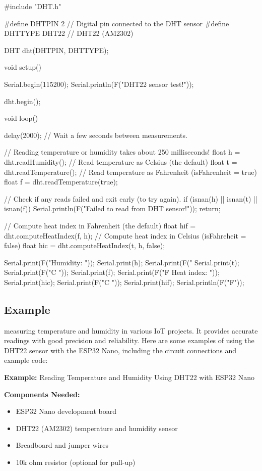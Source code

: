 	\begin{Arduino}
	#include "DHT.h"
	
	#define DHTPIN 2      // Digital pin connected to the DHT sensor
	#define DHTTYPE DHT22 // DHT22 (AM2302)
	
	DHT dht(DHTPIN, DHTTYPE);
	
	void setup() {
		Serial.begin(115200);
		Serial.println(F("DHT22 sensor test!"));
		
		dht.begin();
	}
	
	void loop() {
		delay(2000); // Wait a few seconds between measurements.
		
		// Reading temperature or humidity takes about 250 milliseconds!
		float h = dht.readHumidity();
		// Read temperature as Celsius (the default)
		float t = dht.readTemperature();
		// Read temperature as Fahrenheit (isFahrenheit = true)
		float f = dht.readTemperature(true);
		
		// Check if any reads failed and exit early (to try again).
		if (isnan(h) || isnan(t) || isnan(f)) {
			Serial.println(F("Failed to read from DHT sensor!"));
			return;
		}
		
		// Compute heat index in Fahrenheit (the default)
		float hif = dht.computeHeatIndex(f, h);
		// Compute heat index in Celsius (isFahreheit = false)
		float hic = dht.computeHeatIndex(t, h, false);
		
		Serial.print(F("Humidity: "));
		Serial.print(h);
		Serial.print(F("%
		Serial.print(t);
		Serial.print(F("C "));
		Serial.print(f);
		Serial.print(F("F  Heat index: "));
		Serial.print(hic);
		Serial.print(F("C "));
		Serial.print(hif);
		Serial.println(F("F"));
	}
	
	\end{Arduino}
	
	

	

\subsection{Example}

measuring temperature and humidity in various IoT projects. It provides accurate readings with good precision and reliability. Here are some examples of using the DHT22 sensor with the ESP32 Nano, including the circuit connections and example code:

\textbf{Example:} Reading Temperature and Humidity Using DHT22 with ESP32 Nano


\textbf{Components Needed:}
\begin{itemize}
	\item ESP32 Nano development board
	\item DHT22 (AM2302) temperature and humidity sensor
	\item Breadboard and jumper wires
	\item 10k ohm resistor (optional for pull-up)
\end{itemize}
	



